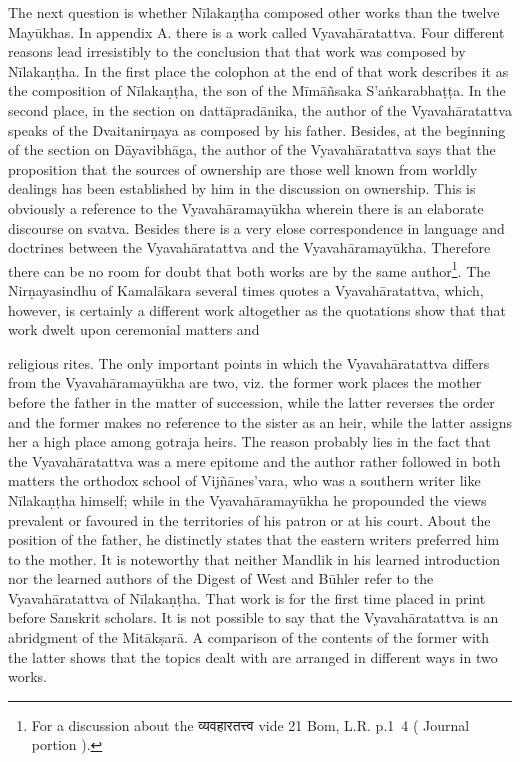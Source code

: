 \documentclass[11pt, openany]{book}
\begin{document}
The next question is whether Nīlakaṇṭha composed other works than the twelve Mayūkhas. In appendix A. there is a work called Vyavahāratattva. Four different reasons lead irresistibly to the conclusion that that work was composed by Nīlakaṇṭha. In the first place the colophon at the end of that work describes it as the composition of Nīlakaṇṭha, the son of the Mīmāñsaka S'aṅkarabhaṭṭa. In the second place, in the section on dattāpradānika, the author of the Vyavahāratattva speaks of the Dvaitanirṇaya as composed by his father. Besides, at the beginning of the section on Dāyavibhāga, the author of the Vyavahāratattva says that the proposition that the sources of ownership are those well known from worldly dealings has been established by him in the discussion on ownership. This is obviously a reference to the Vyavahāramayūkha wherein there is an elaborate discourse on {\qt svatva}. Besides there is a very elose correspondence in language and doctrines between the Vyavahāratattva and the Vyavahāramayūkha. Therefore there can be no room for doubt that both works are by the same author\renewcommand{\thefootnote}{2}\footnote{For a discussion about the व्यवहारतत्त्व vide 21 Bom, L.R. p.1\textendash\ 4 ( Journal portion ).}. The Nirṇayasindhu of Kamalākara several times quotes a Vyavahāratattva, which, however, is certainly a different work altogether as the quotations show that that work dwelt upon ceremonial matters and

\newpage

\noindent
religious rites. The only important points in which the Vyavahāratattva differs from the Vyavahāramayūkha are two, viz. the former work places the mother before the father in the matter of succession, while the latter reverses the order and the former makes no reference to the sister as an heir, while the latter assigns her a high place among gotraja heirs. The reason probably lies in the fact that the Vyavahāratattva was a mere epitome and the author rather followed in both matters the orthodox school of Vijñānes'vara, who was a southern writer like Nīlakaṇṭha himself; while in the Vyavahāramayūkha he propounded the views prevalent or favoured in the territories of his patron or at his court. About the position of the father, he distinctly states that the eastern writers preferred him to the mother. It is noteworthy that neither Mandlik in his learned introduction nor the learned authors of the Digest of West and Būhler refer to the Vyavahāratattva of Nīlakaṇṭha. That work is for the first time placed in print before Sanskrit scholars. It is not possible to say that the Vyavahāratattva is an abridgment of the Mitākṣarā. A comparison of the contents of the former with the latter shows that the topics dealt with are arranged in different ways in two works.
\end{document}
